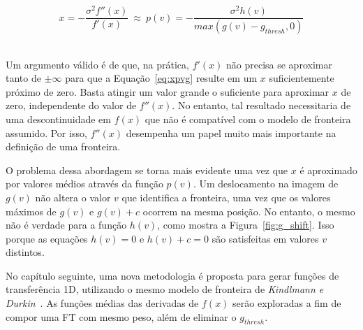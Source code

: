 \begin{equation} \label{eq:xpvg}
	x = -\frac{\sigma^{2}f''(x)}{f'(x)} \ \approx \ 
	p(v) = -\frac{\sigma^{2}h(v)}{max(g(v) - g_{thresh}, 0)}
\end{equation} \

	Um argumento válido é de que, na prática, $ f'(x) $ não precisa se aproximar tanto de $ \pm \infty $ para que a Equação~\eqref{eq:xpvg} resulte em um $ x $ suficientemente próximo de zero. Basta atingir um valor grande o suficiente para aproximar $ x $ de zero, independente do valor de $ f''(x) $. No entanto, tal resultado necessitaria de uma descontinuidade em $ f(x) $ que não é compatível com o modelo de fronteira assumido. Por isso, $ f''(x) $ desempenha um papel muito mais importante na definição de uma fronteira.
	
	O problema dessa abordagem se torna mais evidente uma vez que $ x $ é aproximado por valores médios através da função $ p(v) $. Um deslocamento na imagem de $ g(v) $ não altera o valor $ v $ que identifica a fronteira, uma vez que os valores máximos de $ g(v) $ e $ g(v) + c $ ocorrem na mesma posição. No entanto, o mesmo não é verdade para a função $ h(v) $, como mostra a Figura~\ref{fig:g_shift}. Isso porque as equações $ h(v) = 0 $ e $ h(v) + c = 0 $ são satisfeitas em valores $ v $ distintos.

	No capítulo seguinte, uma nova metodologia é proposta para gerar funções de transferência 1D, utilizando o mesmo modelo de fronteira de \textit{Kindlmann e Durkin}~\cite{gordon}. As funções médias das derivadas de $ f(x) $ serão exploradas a fim de compor uma FT com mesmo peso, além de eliminar o $ g_{thresh} $.